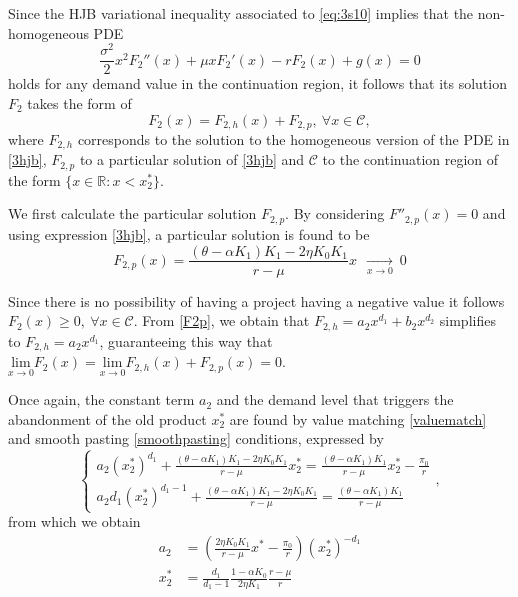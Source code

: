 Since the HJB variational inequality associated to \eqref{eq:3s10} implies that the non-homogeneous PDE 
\begin{equation}
\frac{\sigma^2}{2}x^2F_2''(x)+\mu x F_2'(x) - r F_2(x)+g(x) =0 
\label{3hjb}
\end{equation}
holds for any demand value in the continuation region, it follows that its solution $F_2$ takes the form of
\begin{equation}
F_2(x)=F_{2,h}(x)+F_{2,p}, \  \forall x \in \mathcal{C},
\end{equation}
where $F_{2,h}$ corresponds to the solution to the homogeneous version of the PDE in \eqref{3hjb}, $F_{2,p}$ to a particular solution of \eqref{3hjb} and $\mathcal{C}$ to the continuation region of the form $\{ x \in \mathds{R}: x< x_2^* \}$.

We first calculate the particular solution $F_{2,p}$. By considering $F''_{2,p}(x)=0$ and using expression \eqref{3hjb}, a particular solution is found to be 
\begin{equation}
F_{2,p}(x)=\frac{(\theta-\alpha K_1)K_1-2 \eta K_0 K_1}{r-\mu}x \  \   \xrightarrow[x \rightarrow 0 ]{ } \ 0
	\label{F2p}
\end{equation}


Since there is no possibility of having a project having a negative value it follows $F_2(x) \geq 0, \ \forall x \in \mathcal{C}$. From \eqref{F2p}, we obtain that $F_{2,h}=a_2 x^{d_1}+b_2 x^{d_2}$ simplifies to $F_{2,h}=a_2 x^{d_1}$, guaranteeing this way that $\underset{x \to 0}{\text{lim}} F_2(x)=\underset{x \to 0}{\text{lim}} F_{2,h}(x)+F_{2,p}(x)=0$.

Once again, the constant term $a_2$ and the demand level that triggers the abandonment of the old product $x_2^*$ are found by value matching \eqref{valuematch} and smooth pasting \eqref{smoothpasting} conditions, expressed by
\begin{equation}
\begin{cases}
a_2(x_2^*)^{d_1}+\frac{(\theta-\alpha K_1)K_1-2 \eta K_0 K_1}{r-\mu}x_2^*=\frac{(\theta-\alpha K_1)K_1}{r-\mu} x_2^* -\frac{\pi_0}{r} \\
a_2 d_1(x_2^*)^{d_1-1}+\frac{(\theta-\alpha K_1)K_1-2 \eta K_0 K_1}{r-\mu}=\frac{(\theta-\alpha K_1)K_1}{r-\mu}
\end{cases},
\end{equation}
from which we obtain
\begin{align}
a_2 &= \left( \frac{2\eta K_0 K_1}{r-\mu}x^*-\frac{\pi_0}{r} \right)(x_2^*)^{-d_1} \nonumber \\
x_2^*&=\frac{d_1}{d_1-1} \frac{1-\alpha K_0}{2 \eta K_1} \frac{r-\mu}{r} \label{3:x2}
\end{align}

